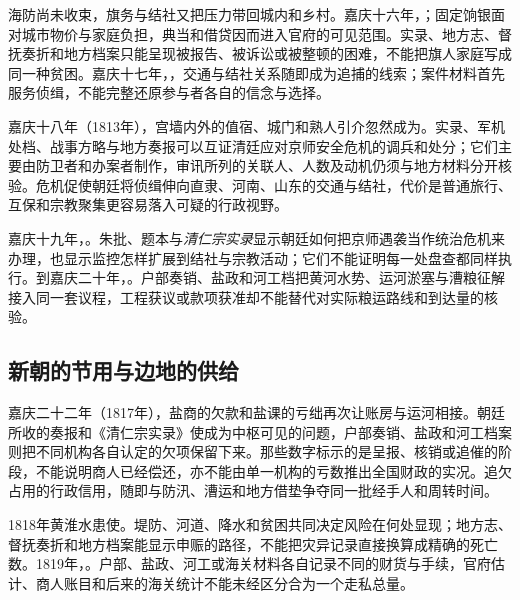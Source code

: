 海防尚未收束，旗务与结社又把压力带回城内和乡村。嘉庆十六年，；固定饷银面对城市物价与家庭负担，典当和借贷因而进入官府的可见范围。实录、地方志、督抚奏折和地方档案只能呈现被报告、被诉讼或被整顿的困难，不能把旗人家庭写成同一种贫困。嘉庆十七年，，交通与结社关系随即成为追捕的线索；案件材料首先服务侦缉，不能完整还原参与者各自的信念与选择。

嘉庆十八年（1813年），宫墙内外的值宿、城门和熟人引介忽然成为。实录、军机处档、战事方略与地方奏报可以互证清廷应对京师安全危机的调兵和处分；它们主要由防卫者和办案者制作，审讯所列的关联人、人数及动机仍须与地方材料分开核验。危机促使朝廷将侦缉伸向直隶、河南、山东的交通与结社，代价是普通旅行、互保和宗教聚集更容易落入可疑的行政视野。

嘉庆十九年，。朱批、题本与\textit{清仁宗实录}显示朝廷如何把京师遇袭当作统治危机来办理，也显示监控怎样扩展到结社与宗教活动；它们不能证明每一处盘查都同样执行。到嘉庆二十年，。户部奏销、盐政和河工档把黄河水势、运河淤塞与漕粮征解接入同一套议程，工程获议或款项获准却不能替代对实际粮运路线和到达量的核验。

\subsection{新朝的节用与边地的供给}

嘉庆二十二年（1817年），盐商的欠款和盐课的亏绌再次让账房与运河相接。朝廷所收的奏报和《清仁宗实录》使成为中枢可见的问题，户部奏销、盐政和河工档案则把不同机构各自认定的欠项保留下来。那些数字标示的是呈报、核销或追催的阶段，不能说明商人已经偿还，亦不能由单一机构的亏数推出全国财政的实况。追欠占用的行政信用，随即与防汛、漕运和地方借垫争夺同一批经手人和周转时间。

1818年黄淮水患使。堤防、河道、降水和贫困共同决定风险在何处显现；地方志、督抚奏折和地方档案能显示申赈的路径，不能把灾异记录直接换算成精确的死亡数。1819年，。户部、盐政、河工或海关材料各自记录不同的财货与手续，官府估计、商人账目和后来的海关统计不能未经区分合为一个走私总量。


